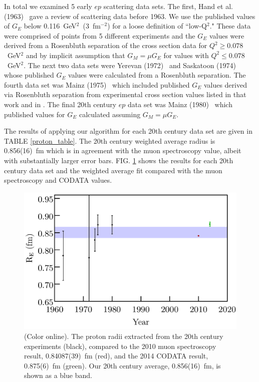 \documentclass[aps,prd,twocolumn,groupedaddress,10pt]{revtex4-1}
\begin{document}
In total we examined 5 early $ep$ scattering data sets. The first, Hand et al. (1963)~\cite{Hand1963} gave a review of scattering data before 1963. We use the published values of $G_E$ below 0.116~GeV$^2$~(3~fm$^{-2}$) for a loose definition of ``low-Q$^2$." These data were comprised of points from 5 different experiments and the $G_E$ values were derived from a Rosenbluth separation of the cross section data for $Q^2 \geq 0.078$~GeV$^2$ and by implicit assumption that $G_M = \mu G_E$ for values with $Q^2 \leq 0.078$~GeV$^2$. The next two data sets were Yerevan (1972)~\cite{Yerevan1972} and Saskatoon (1974)~\cite{Saskatoon1974} whose published $G_E$ values were calculated from a Rosenbluth separation. The fourth data set was Mainz (1975)~\cite{Mainz1975} which included published $G_E$ values derived via Rosenbluth separation from experimental cross section values listed in that work and in \cite{Mainz1974}. The final 20th century $ep$ data set was Mainz (1980)~\cite{Mainz1980} which published values for $G_E$ calculated assuming $G_M = \mu G_E$.

The results of applying our algorithm for each 20th century data set are given in TABLE \ref{proton_table}. The 20th century weighted average radius is 0.856(16)~fm which is in agreement with the muon spectroscopy value, albeit with substantially larger error bars.  FIG. \ref{progression_of_radii} shows the results for each 20th century data set and the weighted average fit compared with the muon spectroscopy and CODATA values. 
\begin{figure}[h!]
\includegraphics[scale=0.41]{progression_of_radii.pdf}
\caption{(Color online). The proton radii extracted from the 20th century experiments (black), compared to the 2010 muon spectroscopy result, 0.84087(39)~fm (red), and the 2014 CODATA result, 0.875(6)~fm (green). Our 20th century average, 0.856(16)~fm, is shown as a blue band.}
\label{progression_of_radii}
\end{figure}
\end{document}
